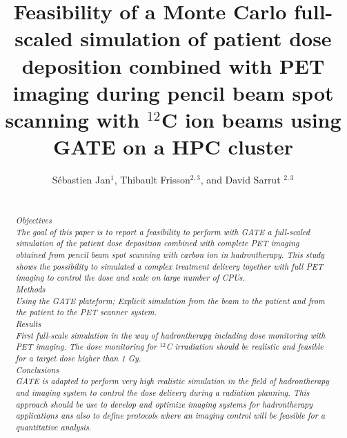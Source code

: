 \documentclass[11pt]{iopart}
\begin{document}
\title[Gate Hadron PET]{Feasibility of a Monte Carlo full-scaled simulation of patient dose deposition combined with PET imaging during pencil beam spot scanning with $^{12}$C ion beams using GATE on a HPC cluster}


\author{S{\'e}bastien Jan$^{1}$, Thibault Frisson$^{2,3}$, and David Sarrut $^{2,3}$}

\address{$^1$ CEA, Service Hospitalier Frédéric Joliot, Orsay, France}
\address{$^2$ University of Lyon, CREATIS-LRMN; CNRS UMR5220; INSA-Lyon, France}
\address{$^3$ University of Lyon, L\'eon B\'erard Cancer Center, F-69373, Lyon, France}

\linenumbers
\begin{abstract}\\

{\it Objectives\\
The goal of this paper is to report a feasibility to perform with GATE a full-scaled simulation of the patient dose deposition combined with complete PET imaging obtained from pencil beam spot scanning with carbon ion in hadrontherapy. This study shows the possibility to simulated a complex treatment delivery together with full PET imaging to control the dose and scale on large number of CPUs.}\\

{\it Methods\\
Using the GATE plateform; Explicit simulation from the beam to the patient and from the patient to the PET scanner system.}\\

{\it Results\\
First full-scale simulation in the way of hadrontherapy including dose monitoring with PET imaging. The dose monitoring for $^{12}$C irradiation should be realistic and feasible for a target dose higher than 1 Gy.}\\

{\it Conclusions\\
GATE is adapted to perform very high realistic simulation in the field of hadrontherapy and imaging system to control the dose delivery during a radiation planning. This approach should be use to develop and optimize imaging systems for hadrontherapy applications ans also to define protocols where an imaging control will be feasible for a quantitative analysis.}\\

\end{abstract}
\end{document}

